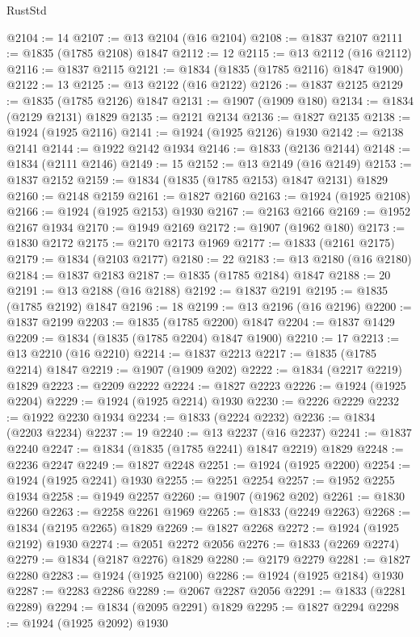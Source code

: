\begin{lexlean}{RustStd}
\begin{coremodule}
@2104 := 14
@2107 := @13 @2104 (@16 @2104)
@2108 := @1837 @2107
@2111 := @1835 (@1785 @2108) @1847
@2112 := 12
@2115 := @13 @2112 (@16 @2112)
@2116 := @1837 @2115
@2121 := @1834 (@1835 (@1785 @2116) @1847 @1900)
@2122 := 13
@2125 := @13 @2122 (@16 @2122)
@2126 := @1837 @2125
@2129 := @1835 (@1785 @2126) @1847
@2131 := @1907 (@1909 @180)
@2134 := @1834 (@2129 @2131) @1829
@2135 := @2121 @2134
@2136 := @1827 @2135
@2138 := @1924 (@1925 @2116)
@2141 := @1924 (@1925 @2126) @1930
@2142 := @2138 @2141
@2144 := @1922 @2142 @1934
@2146 := @1833 (@2136 @2144)
@2148 := @1834 (@2111 @2146)
@2149 := 15
@2152 := @13 @2149 (@16 @2149)
@2153 := @1837 @2152
@2159 := @1834 (@1835 (@1785 @2153) @1847 @2131) @1829
@2160 := @2148 @2159
@2161 := @1827 @2160
@2163 := @1924 (@1925 @2108)
@2166 := @1924 (@1925 @2153) @1930
@2167 := @2163 @2166
@2169 := @1952 @2167 @1934
@2170 := @1949 @2169
@2172 := @1907 (@1962 @180)
@2173 := @1830 @2172
@2175 := @2170 @2173 @1969
@2177 := @1833 (@2161 @2175)
@2179 := @1834 (@2103 @2177)
@2180 := 22
@2183 := @13 @2180 (@16 @2180)
@2184 := @1837 @2183
@2187 := @1835 (@1785 @2184) @1847
@2188 := 20
@2191 := @13 @2188 (@16 @2188)
@2192 := @1837 @2191
@2195 := @1835 (@1785 @2192) @1847
@2196 := 18
@2199 := @13 @2196 (@16 @2196)
@2200 := @1837 @2199
@2203 := @1835 (@1785 @2200) @1847
@2204 := @1837 @1429
@2209 := @1834 (@1835 (@1785 @2204) @1847 @1900)
@2210 := 17
@2213 := @13 @2210 (@16 @2210)
@2214 := @1837 @2213
@2217 := @1835 (@1785 @2214) @1847
@2219 := @1907 (@1909 @202)
@2222 := @1834 (@2217 @2219) @1829
@2223 := @2209 @2222
@2224 := @1827 @2223
@2226 := @1924 (@1925 @2204)
@2229 := @1924 (@1925 @2214) @1930
@2230 := @2226 @2229
@2232 := @1922 @2230 @1934
@2234 := @1833 (@2224 @2232)
@2236 := @1834 (@2203 @2234)
@2237 := 19
@2240 := @13 @2237 (@16 @2237)
@2241 := @1837 @2240
@2247 := @1834 (@1835 (@1785 @2241) @1847 @2219) @1829
@2248 := @2236 @2247
@2249 := @1827 @2248
@2251 := @1924 (@1925 @2200)
@2254 := @1924 (@1925 @2241) @1930
@2255 := @2251 @2254
@2257 := @1952 @2255 @1934
@2258 := @1949 @2257
@2260 := @1907 (@1962 @202)
@2261 := @1830 @2260
@2263 := @2258 @2261 @1969
@2265 := @1833 (@2249 @2263)
@2268 := @1834 (@2195 @2265) @1829
@2269 := @1827 @2268
@2272 := @1924 (@1925 @2192) @1930
@2274 := @2051 @2272 @2056
@2276 := @1833 (@2269 @2274)
@2279 := @1834 (@2187 @2276) @1829
@2280 := @2179 @2279
@2281 := @1827 @2280
@2283 := @1924 (@1925 @2100)
@2286 := @1924 (@1925 @2184) @1930
@2287 := @2283 @2286
@2289 := @2067 @2287 @2056
@2291 := @1833 (@2281 @2289)
@2294 := @1834 (@2095 @2291) @1829
@2295 := @1827 @2294
@2298 := @1924 (@1925 @2092) @1930

\end{coremodule}
\end{lexlean}
